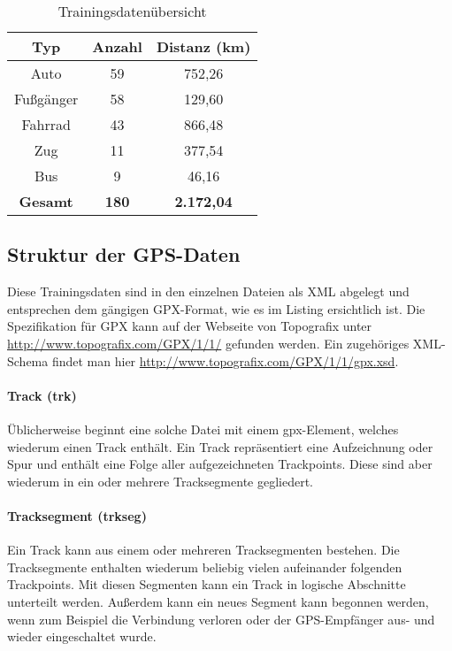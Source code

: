 \begin{table}
\centering
\begin{tabular}{| c | c | c | }
\hline
\textbf{Typ} & \textbf{Anzahl} & \textbf{Distanz (km)}\\ 
\hline
Auto &	59 & 752,26\\
\hline
Fußgänger &	58 & 129,60\\
\hline
Fahrrad	& 43 & 866,48\\
\hline
Zug & 11 & 377,54\\
\hline
Bus	& 9 & 46,16\\
\hline
\textbf{Gesamt} & \textbf{180} & \textbf{2.172,04}\\
\hline
\end{tabular}
\caption{Trainingsdatenübersicht}
\label{datenuebsicht}
\end{table}

\subsection{Struktur der GPS-Daten}
Diese Trainingsdaten sind in den einzelnen Dateien als XML abgelegt und entsprechen dem gängigen GPX-Format, wie es im Listing  ersichtlich ist. Die Spezifikation für GPX kann auf der Webseite von Topografix unter \url{ http://www.topografix.com/GPX/1/1/} gefunden werden. Ein zugehöriges XML-Schema findet man hier \url{http://www.topografix.com/GPX/1/1/gpx.xsd}. \cite{topografix_gpx_2004} 

\paragraph{Track (trk)}
Üblicherweise beginnt eine solche Datei mit einem gpx-Element, welches wiederum einen Track enthält. Ein Track repräsentiert eine Aufzeichnung oder Spur und enthält eine Folge aller aufgezeichneten Trackpoints. Diese sind aber wiederum in ein oder mehrere Tracksegmente gegliedert.

\paragraph{Tracksegment (trkseg)}
Ein Track kann aus einem oder mehreren Tracksegmenten bestehen. Die Tracksegmente enthalten wiederum beliebig vielen aufeinander folgenden Trackpoints. Mit diesen Segmenten kann ein Track in logische Abschnitte unterteilt werden. Außerdem kann ein neues Segment kann begonnen werden, wenn zum Beispiel die Verbindung verloren oder der GPS-Empfänger aus- und wieder eingeschaltet wurde.

